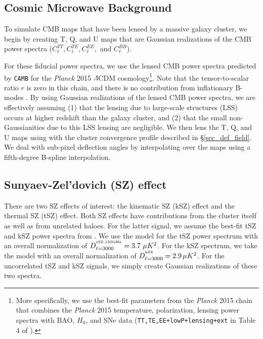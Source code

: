 \subsection{Cosmic Microwave Background}
\label{sec_appendix_CMB}

To simulate CMB maps that have been lensed by a massive galaxy cluster, we begin by creating T, Q, and U maps that are Gaussian realizations \citep{kamionkowski97} of the CMB power spectra ($C_{\ell}^{TT}, C_{\ell}^{TE}, C_{\ell}^{EE},$ and $C_{\ell}^{BB}$). 
\iffalse{Note that the Q and U spectra are set by $C_{\ell}^{EE}$ and $C_{\ell}^{BB}$ according to:
\begin{eqnarray}
Q_{\ell} &=& E_{\ell}\ cos (2 \phi_{\ell}) - B_{\ell}\ sin (2 \phi_{\ell})\\
U_{\ell} &=& E_{\ell}\ sin (2 \phi_{\ell}) + B_{\ell}\ cos (2 \phi_{\ell})
\label{eq_QU_from_EB}
\end{eqnarray}}\fi
For these fiducial power spectra, we use the lensed CMB power spectra predicted by \texttt{CAMB} \citep{lewis00} for the \emph{Planck} 2015 $\Lambda$CDM cosmology\footnote{More specifically, we use the best-fit parameters from the \emph{Planck} 2015 chain that combines the \emph{Planck} 2015 temperature, polarization, lensing power spectra with BAO, $H_{0}$, and SNe data (\texttt{TT,TE,EE+lowP+lensing+ext} in Table 4 of \cite{planck15-13}).}. Note that the tensor-to-scalar ratio $r$ is zero in this chain, and there is no contribution from inflationary B-modes \citep{baumann08}. By using Gaussian realizations of the lensed CMB power spectra, we are effectively assuming (1) that the lensing due to large-scale structures (LSS) occurs at higher redshift than the galaxy cluster, and (2) that the small non-Gaussianities due to this LSS lensing are negligible. We then lens the T, Q, and U maps using with the cluster convergence profile described in \S\ref{sec_def_field}. 
We deal with sub-pixel deflection angles by interpolating over the maps using a fifth-degree B-spline interpolation. 

\subsection{Sunyaev-Zel'dovich (SZ) effect}
\label{sec_appendix_SZ}

There are two SZ effects of interest: the kinematic SZ (kSZ) effect and the thermal SZ (tSZ) effect. Both SZ effects have contributions from the cluster itself as well as from unrelated haloes. For the latter signal, we assume the best-fit tSZ and kSZ power spectra from \citet{george15}. 
We use the \citet{shaw10} model for the tSZ power spectrum with an overall normalization of \mbox{$D_{\ell=3000}^{^{\rm tSZ, 150 GHz}} = 3.7\ \mu K^{2}$}. For the kSZ spectrum, we take the \citet{shaw12} model  with an overall normalization of \mbox{$D_{\ell=3000}^{^{\rm kSZ}} = 2.9\, \mu K^{2}$}. For the uncorrelated tSZ and kSZ signals, we simply create Gaussian realizations of these two spectra. 

